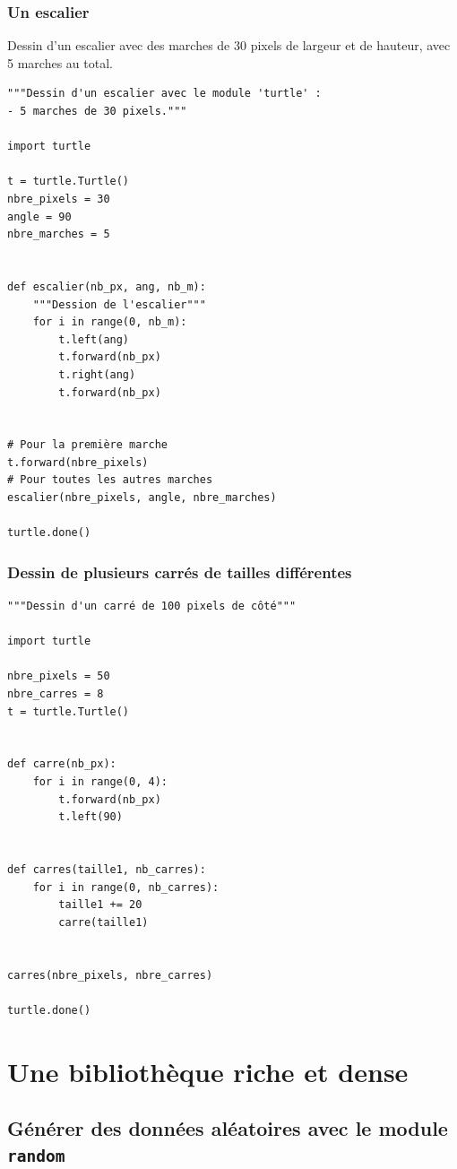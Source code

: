 \documentclass[a4paper,12pt]{book}
\begin{document}
\section{Un escalier}
Dessin d'un escalier avec des marches de 30 pixels de largeur et de hauteur, avec 5 marches au total.
\begin{lstlisting}
"""Dessin d'un escalier avec le module 'turtle' :
- 5 marches de 30 pixels."""

import turtle

t = turtle.Turtle()
nbre_pixels = 30
angle = 90
nbre_marches = 5


def escalier(nb_px, ang, nb_m):
    """Dession de l'escalier"""
    for i in range(0, nb_m):
        t.left(ang)
        t.forward(nb_px)
        t.right(ang)
        t.forward(nb_px)


# Pour la première marche
t.forward(nbre_pixels)
# Pour toutes les autres marches
escalier(nbre_pixels, angle, nbre_marches)

turtle.done()
\end{lstlisting}
\medskip

\section{Dessin de plusieurs carrés de tailles différentes}
\begin{lstlisting}
"""Dessin d'un carré de 100 pixels de côté"""

import turtle

nbre_pixels = 50
nbre_carres = 8
t = turtle.Turtle()


def carre(nb_px):
    for i in range(0, 4):
        t.forward(nb_px)
        t.left(90)


def carres(taille1, nb_carres):
    for i in range(0, nb_carres):
        taille1 += 20
        carre(taille1)


carres(nbre_pixels, nbre_carres)

turtle.done()
\end{lstlisting}
\medskip

\part{Une bibliothèque riche et dense}
\chapter{Générer des données aléatoires avec le module \texttt{random}}
\end{document}
